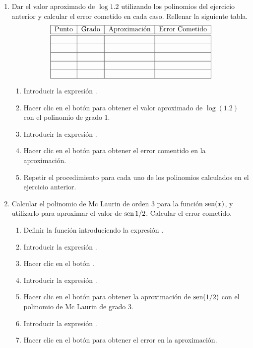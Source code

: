 \begin{enumerate}[leftmargin=*]
\item Dar el valor aproximado de $\log 1.2$ utilizando los polinomios del ejercicio anterior y calcular el error cometido en cada caso. 
Rellenar la siguiente tabla.
\[
\begin{tabular}{|c|c|c|c|}
\hline
Punto & Grado & Aproximación
& Error Cometido \\
\hline\hline
&  &  &  \\ \hline
&  &  &  \\ \hline
&  &  &  \\ \hline
&  &  &  \\ \hline
&  &  &  \\ \hline
\end{tabular}
\]

\begin{indicacion}
{\begin{enumerate}
\item Introducir la expresión .
\item Hacer clic en el botón  para obtener el valor aproximado de $\log(1.2)$ con el polinomio de grado
1. 
\item Introducir la expresión .
\item Hacer clic en el botón  para obtener el error comentido en la aproximación.
\item Repetir el procedimiento para cada uno de los polinomios calculados en el ejercicio anterior. 
\end{enumerate}
}
\end{indicacion}

\item Calcular el polinomio de Mc Laurin de orden 3 para la función $\mathop{\rm sen}\nolimits(x)$, y utilizarlo para aproximar el valor de
$\mathop{\rm sen}\nolimits 1/2$.
Calcular el error cometido.

\begin{indicacion}
{\begin{enumerate}
\item Definir la función introduciendo la expresión . 
\item Introducir la expresión .
\item Hacer clic en el botón .
\item Introducir la expresión .
\item Hacer clic en el botón  para obtener la aproximación de $\mathop{\rm sen}\nolimits(1/2)$ con el polinomio de Mc Laurin
de grado 3.
\item Introducir la expresión .
\item Hacer clic en el botón  para obtener el error en la aproximación.
\end{enumerate}
}
\end{indicacion}


\end{enumerate}
